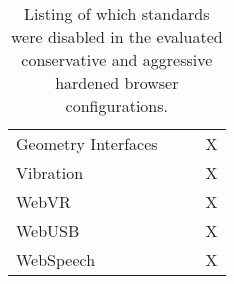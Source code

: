 \begin{table}[th]
{\begin{tabular}{ l | c c c }
          Geometry Interfaces                           &   &   & X \\
          Vibration                                     &   &   & X \\
          WebVR                                         &   &   & X \\
          WebUSB                                        &   &   & X \\
          WebSpeech                                     &   &   & X \\
        \bottomrule
      \end{tabular}
    }
    \caption{Listing of which standards were disabled in the evaluated
    conservative and aggressive hardened browser configurations.}
    \label{table:browser-configs}
  \end{table}
